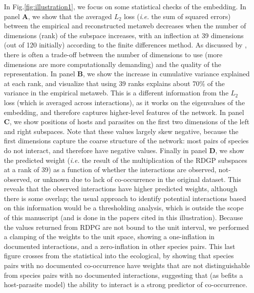 In Fig.\ref{fig:illustration1}, we focus on some statistical checks of the
embedding. In panel \textbf{A}, we show that the averaged \(L_2\) loss
(\emph{i.e.} the sum of squared errors) between the empirical and
reconstructed metaweb decreases when the number of dimensions (rank) of
the subspace increases, with an inflection at 39 dimensions (out of 120
initially) according to the finite differences method. As discussed by
\cite{Runghen2021Exploiting}, there is often a trade-off between the number of
dimensions to use (more dimensions are more computationally demanding)
and the quality of the representation. In panel \textbf{B}, we show the
increase in cumulative variance explained at each rank, and visualize
that using 39 ranks explains about 70\% of the variance in the empirical
metaweb. This is a different information from the \(L_2\) loss (which is
averaged across interactions), as it works on the eigenvalues of the
embedding, and therefore captures higher-level features of the network.
In panel \textbf{C}, we show positions of hosts and parasites on the
first two dimensions of the left and right subspaces. Note that these
values largely skew negative, because the first dimensions capture the
coarse structure of the network: most pairs of species do not interact,
and therefore have negative values. Finally in panel \textbf{D}, we show
the predicted weight (\emph{i.e.} the result of the multiplication of
the RDGP subspaces at a rank of 39) as a function of whether the
interactions are observed, not-observed, or unknown due to lack of
co-occurrence in the original dataset. This reveals that the observed
interactions have higher predicted weights, although there is some
overlap; the usual approach to identify potential interactions based on
this information would be a thresholding analysis, which is outside the
scope of this manuscript (and is done in the papers cited in this
illustration). Because the values returned from RDPG are not bound to
the unit interval, we performed a clamping of the weights to the unit
space, showing a one-inflation in documented interactions, and a
zero-inflation in other species pairs. This last figure crosses from the
statistical into the ecological, by showing that species pairs with no
documented co-occurrence have weights that are not distinguishable from
species pairs with no documented interactions, suggesting that (as
befits a host-parasite model) the ability to interact is a strong
predictor of co-occurrence.

